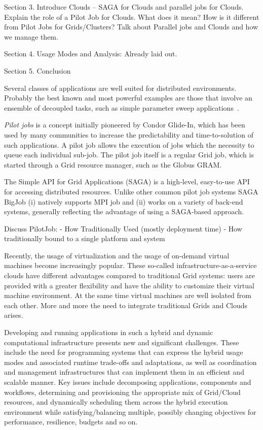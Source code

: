 \documentclass[conference,final]{IEEEtran}
\newcommand{\up}{\vspace*{-1em}}
\begin{document}
\bigskip 

Section 3. Introduce Clouds -- SAGA for Clouds and parallel jobs for
Clouds. Explain the role of a Pilot Job for Clouds. What does it mean?
How is it different from Pilot Jobs for Grids/Clusters?  Talk about
Parallel jobs and Clouds and how we manage them.

\bigskip 

Section 4. Usage Modes and Analysis: Already laid out.

\bigskip 
Section 5. Conclusion




Several classes of applications are well suited for distributed
environments. Probably the best known and most powerful examples are
those that involve an ensemble of decoupled tasks, such as simple
parameter sweep applications~\cite{1239909}.

\emph{Pilot jobs} is a concept initially pioneered by Condor Glide-In, which
has been used by many communities to increase the predictability
and time-to-solution of such applications. A pilot job allows the execution 
of jobs which the necessity to queue each individual sub-job. The pilot job itself
is a regular Grid job, which is started through a Grid resource manager, such as
the Globus GRAM.

The Simple API for Grid Applications (SAGA) is a high-level, easy-to-use API for 
accessing distributed resources. Unlike other common pilot job systems SAGA BigJob 
(i) natively supports MPI job and (ii) works on a variety of back-end systems, 
generally reflecting the advantage of using a SAGA-based approach.

Discuss PilotJob:
- How Traditionally Used (mostly deployment time)
- How traditionally bound to a single platform and system

Recently, the usage of virtualization and the usage of on-demand virtual machines
become increasingly popular. These so-called infrastructure-as-a-service clouds have
different advantages compared to traditional Grid systems: users are provided
with a greater flexibility and have the ability to customize their virtual machine
environment. At the same time virtual machines are well isolated from each other. More and
more the need to integrate traditional Grids and Clouds arises.

Developing and running applications in such a hybrid and dynamic computational 
infrastructure presents new and significant challenges. These include the need for programming 
systems that can express the hybrid usage modes and associated runtime trade-offs and adaptations, 
as well as coordination and management infrastructures that can implement them in an efficient 
and scalable manner. Key issues include decomposing applications, components and workflows, 
determining and provisioning the appropriate mix of Grid/Cloud resources, and dynamically scheduling 
them across the hybrid execution environment while satisfying/balancing multiple, possibly changing 
objectives for performance, resilience, budgets and so on.
\end{document}
